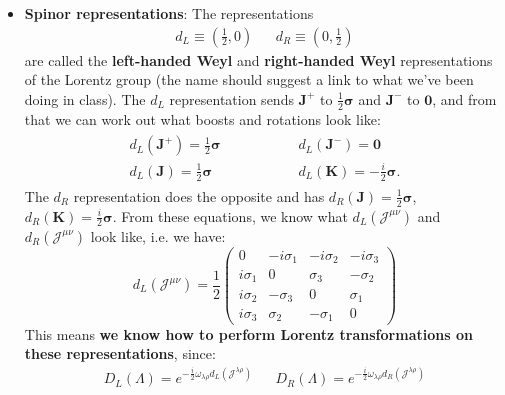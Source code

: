 \documentclass[12pt, oneside]{article}   	%
\theoremstyle{definition}
\begin{document}
\begin{itemize}
	\item \textbf{Spinor representations}: The representations
	\begin{align}
		d_L\equiv \left(\frac{1}{2}, 0\right) && d_R\equiv \left(0, \frac{1}{2} \right)
	\end{align} 
	are called the \textbf{left-handed Weyl} and \textbf{right-handed Weyl} representations of the Lorentz group (the name should suggest a link to what we've been doing in class). The $d_L$ representation sends $\bm J^+$ to $\frac{1}{2} \bm\sigma$ and $\bm J^-$ to $\bm 0$, and from that we can work out what boosts and rotations look like:
	\begin{align} \begin{split}
		d_L(\bm J^+) = \frac{1}{2} \bm \sigma \hspace{2cm}& d_L(\bm J^-) = \bm 0 \\
		d_L(\bm J) = \frac{1}{2} \bm \sigma \hspace{2cm}& d_L(\bm K) = -\frac{i}{2} \bm \sigma.
	\end{split} \end{align}
	The $d_R$ representation does the opposite and has $d_R(\bm J) = \frac{1}{2} \bm\sigma$, $d_R(\bm K) = \frac{i}{2} \bm \sigma$. From these equations, we know what $d_L(\mathcal J^{\mu\nu})$ and $d_R(\mathcal J^{\mu\nu})$ look like, i.e. we have:
	\begin{equation}
		d_L(\mathcal J^{\mu\nu}) = 
			\frac{1}{2}\begin{pmatrix} 
				0 & -i\sigma_1 & -i\sigma_2 & -i\sigma_3 \\
				i\sigma_1 & 0 & \sigma_3 & -\sigma_2 \\
				i\sigma_2 & -\sigma_3 & 0 & \sigma_1 \\
				i\sigma_3 & \sigma_2 & -\sigma_1 & 0
			\end{pmatrix}
	\end{equation}
	This means \textbf{we know how to perform Lorentz transformations on these representations}, since:
	\begin{align}
		D_L(\Lambda) = e^{-\frac{i}{2} \omega_{\lambda\rho} d_L(\mathcal J^{\lambda\rho}) } && D_R(\Lambda) = e^{-\frac{i}{2} \omega_{\lambda\rho} d_R(\mathcal J^{\lambda\rho}) }
	\end{align}
	

\end{itemize}
\end{document}
